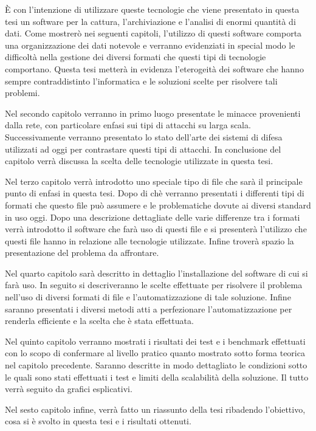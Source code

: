 \documentclass[../main.tex]{subfiles}
\begin{document}
È con l'intenzione di utilizzare queste tecnologie che viene presentato in questa tesi un software per la cattura, l'archiviazione e l'analisi di enormi quantità di dati. Come mostrerò nei seguenti capitoli, l'utilizzo di questi software comporta una organizzazione dei dati notevole e verranno evidenziati in special modo le difficoltà nella gestione dei diversi formati che questi tipi di tecnologie comportano. Questa tesi metterà in evidenza l'eterogeità dei software che hanno sempre contraddistinto l'informatica e le soluzioni scelte per risolvere tali problemi. \newline

Nel secondo capitolo verranno in primo luogo presentate le minacce provenienti dalla rete, con particolare enfasi sui tipi di attacchi su larga scala. Successivamente verranno presentato lo stato dell'arte dei sistemi di difesa utilizzati ad oggi per contrastare questi tipi di attacchi. In conclusione del capitolo verrà discussa la scelta delle tecnologie utilizzate in questa tesi. \newline

Nel terzo capitolo verrà introdotto uno speciale tipo di file che sarà il principale punto di enfasi in questa tesi. Dopo di chè verranno presentati i differenti tipi di formati che questo file può assumere e le problematiche dovute ai diversi standard in uso oggi. Dopo una descrizione dettagliate delle varie differenze tra i formati verrà introdotto il software che farà uso di questi file e si presenterà l'utilizzo che questi file hanno in relazione alle tecnologie utilizzate. Infine troverà spazio la presentazione del problema da affrontare. \newline

Nel quarto capitolo sarà descritto in dettaglio l'installazione del software di cui si farà uso. In seguito si descriveranno le scelte effettuate per risolvere il problema nell'uso di diversi formati di file e l'automatizzazione di tale soluzione. Infine saranno presentati i diversi metodi atti a perfezionare l'automatizzazione per renderla efficiente e la scelta che è stata effettuata. \newline

Nel quinto capitolo verranno mostrati i risultati dei test e i benchmark effettuati con lo scopo di confermare al livello pratico quanto mostrato sotto forma teorica nel capitolo precedente. Saranno descritte in modo dettagliato le condizioni sotto le quali sono stati effettuati i test e limiti della scalabilità della soluzione. Il tutto verrà seguito da grafici esplicativi. \newline

Nel sesto capitolo infine, verrà fatto un riassunto della tesi ribadendo l'obiettivo, cosa si è svolto in questa tesi e i risultati ottenuti. \newline
\end{document}
